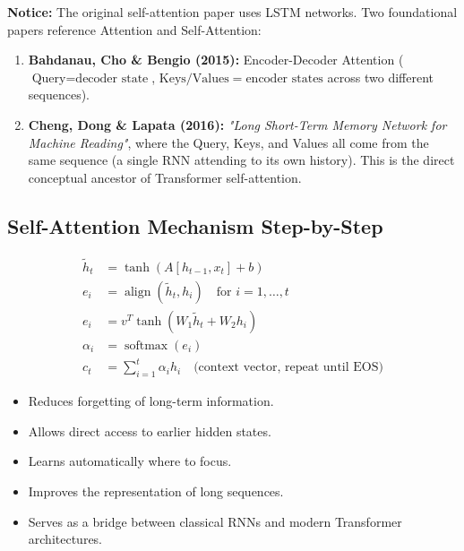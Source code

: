 \begin{propertybox}
\textbf{Notice:} The original self-attention paper uses LSTM networks. Two foundational papers reference Attention and Self-Attention:
\begin{enumerate}
    \item \textbf{Bahdanau, Cho \& Bengio (2015):} Encoder-Decoder Attention ($\text{Query} = \text{decoder state}$, $\text{Keys}/\text{Values} = \text{encoder states}$ across two different sequences).
    \item \textbf{Cheng, Dong \& Lapata (2016):} \textit{"Long Short-Term Memory Network for Machine Reading"}, where the Query, Keys, and Values all come from the same sequence (a single RNN attending to its own history). This is the direct conceptual ancestor of Transformer self-attention.
\end{enumerate}
\end{propertybox}

\subsection{Self-Attention Mechanism Step-by-Step}

\begin{align}
\tilde{h}_t &= \tanh(A[h_{t-1}, x_t] + b) \\
e_i &= \operatorname{align}(\tilde{h}_t, h_i) \quad \text{for } i = 1, \dots, t \\
e_i &= v^T \tanh(W_1 \tilde{h}_t + W_2 h_i) \\
\alpha_i &= \operatorname{softmax}(e_i) \\
c_t &= \sum_{i=1}^t \alpha_i h_i \quad \text{(context vector, repeat until EOS)}
\end{align}

\begin{advbox}
\begin{itemize}
    \item Reduces forgetting of long-term information.
    \item Allows direct access to earlier hidden states.
    \item Learns automatically where to focus.
    \item Improves the representation of long sequences.
    \item Serves as a bridge between classical RNNs and modern Transformer architectures.
\end{itemize}
\end{advbox}

